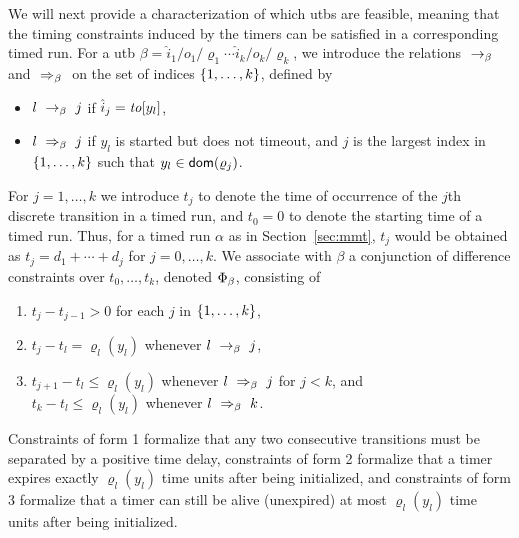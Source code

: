 We will next provide a characterization of which utbs are feasible, meaning
that the timing constraints induced by the timers can be satisfied in a
corresponding timed run. 
For a utb $\beta  =  {\hat{i}_1/o_1/\varrho_1}  \cdots {\hat{i}_k/o_k/\varrho_k}$,
we introduce the relations $\ \rightarrow_{\beta} \ $ and $\ \Rightarrow_{\beta}\ $
on the set of indices $\lbrace 1, \ldots , k\rbrace$, defined by
\begin{itemize}
\item
  $l \ \rightarrow_{\beta} \  j$ if $\hat{i}_j = \mathit{to}[y_l]$,
  \item
    $l \ \Rightarrow_{\beta}\  j$ if $y_l$ is started but does not timeout, and
    $j$ is the largest index in $\lbrace 1, \ldots , k\rbrace$
    such that $y_l \in {\textsf{dom}}(\varrho_{j})$.
\end{itemize}
For $j = 1, \ldots, k$ we introduce $t_j$ to denote the time of occurrence of
the $j$th discrete transition in a timed run, and $t_0 = 0$ to denote
the starting time of a timed run. Thus, for a timed run $\alpha$ as
in Section~\ref{sec:mmt}, $t_j$ would be obtained as
$t_j = d_1 + \cdots + d_j$ for $j = 0 , \ldots, k$.
We associate with $\beta$ a conjunction of difference constraints over
$t_0, \ldots, t_{k}$, denoted $\Phi_{\beta}$, consisting of
\begin{enumerate}
\item
$t_{j} - t_{j-1} > 0$ for each $j$ in $\lbrace 1, \ldots , k\rbrace$,
\item
$t_j - t_l = \varrho_l(y_l)$ whenever $l \ \rightarrow_{\beta} \  j$,
\item
  $t_{j+1} -t_l \leq \varrho_l(y_l)$ whenever $l \ \Rightarrow_{\beta}\  j$ for $j < k$, and
  \\
  $t_{k} -t_l \leq \varrho_l(y_l)$ whenever $l \ \Rightarrow_{\beta}\  k$.
\end{enumerate}
Constraints of form 1 formalize that any two consecutive transitions must
be separated by a positive time delay,
constraints of form 2 formalize that a timer expires exactly $\varrho_l(y_l)$
time units after being initialized, and
constraints of form 3 formalize that a timer can still be alive (unexpired)
at most $\varrho_l(y_l)$ time units after being initialized.

